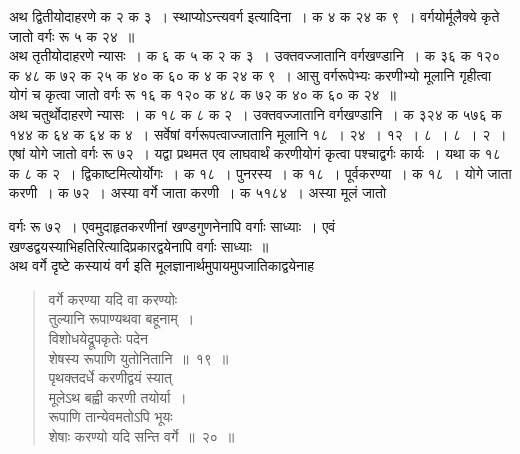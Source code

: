 \documentclass[11pt, openany]{book}
\begin{document}
\vspace{-3mm}
 अथ द्वितीयोदाहरणे क २ क ३~। स्थाप्योऽन्त्यवर्ग इत्यादिना~। 
क ४ क २४ क ९~। वर्गयोर्मूलैक्ये कृते जातो वर्गः रू ५ 
क २४~॥ \\

\vspace{-3mm}
 अथ तृतीयोदाहरणे न्यासः~। क ६ क ५ क २ क ३~। उक्तवज्जातानि वर्गखण्डानि~। क ३६ क १२० क ४८ क ७२ क २५ क ४० 
क ६० क ४ क २४ क ९~। आसु वर्गरूपेभ्यः करणीभ्यो मूलानि 
गृहीत्वा योगं च कृत्वा जातो वर्गः रू १६ क १२० क ४८ क ७२ 
क ४० क ६० क २४~॥ \\

\vspace{-3mm}
 अथ चतुर्थोदाहरणे न्यासः~। क १८ क ८ क २~। उक्तवज्जातानि 
वर्गखण्डानि~। क ३२४ क ५७६ क १४४ क ६४ क ६४ क ४~। सर्वेषां 
वर्गरूपत्वाज्जातानि मूलानि १८~। २४~। १२~। ८~। ८~। २~। एषां योगे 
जातो वर्गः रू ७२~। यद्वा प्रथमत एव लाघवार्थं करणीयोगं कृत्वा 
पश्चाद्वर्गः कार्यः~। यथा क १८ क ८ क २~। द्विकाष्टमित्योर्योगः~। 
क १८~। पुनरस्य~। क १८~। पूर्वकरण्या~। क १८~। योगे जाता 
करणी~। क ७२~। अस्या वर्गे जाता करणी~। क ५१८४~। अस्या मूलं जातो



\newpage%

\noindent वर्गः रू ७२~। एवमुदाहृतकरणीनां खण्डगुणनेनापि वर्गाः साध्याः~। एवं खण्डद्वयस्याभिहतिरित्यादिप्रकारद्वयेनापि वर्गाः साध्याः~॥ \\

\vspace{-3mm}
 अथ वर्गे दृष्टे कस्यायं वर्ग इति मूलज्ञानार्थमुपायमुपजातिकाद्वयेनाह\textendash   

 \label{19}
\begin{quote}
    \bs
      वर्गे करण्या यदि वा करण्योः\\

\vspace{-7mm}
\hspace{1cm} तुल्यानि रूपाण्यथवा बहूनाम्~। \\

 \vspace{-7mm}
 विशोधयेद्रूपकृतेः पदेन \\

\vspace{-7mm}
\hspace{1cm} शेषस्य रूपाणि युतोनितानि~॥~१९~॥\\

 \vspace{-4mm}
 \label{20}
 पृथक्तदर्धे करणीद्वयं स्यात्\\

\vspace{-7mm}
\hspace{1cm} मूलेऽथ बह्वी करणी तयोर्या~। \\

 \vspace{-7mm}
 रूपाणि तान्येवमतोऽपि भूयः \\

\vspace{-7mm}
\hspace{1cm} शेषाः करण्यो यदि सन्ति वर्गे~॥~२०~॥

\end{quote}
\end{document}

